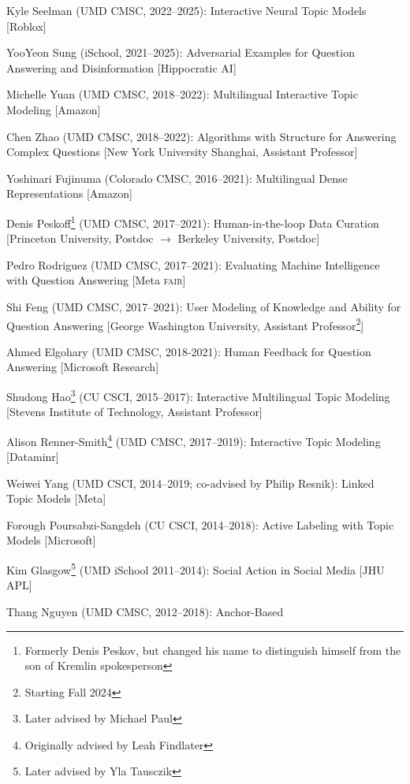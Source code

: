 \begin{enumerate*}
        \item Kyle Seelman (UMD CMSC, 2022--2025): Interactive Neural
          Topic Models [Roblox]
       \item YooYeon Sung (iSchool, 2021--2025): Adversarial Examples for
         Question Answering and Disinformation [Hippocratic AI]
  \item Michelle Yuan (UMD CMSC, 2018--2022): Multilingual Interactive Topic
  Modeling [Amazon]
      \item Chen Zhao (UMD CMSC, 2018--2022): Algorithms with
        Structure for Answering Complex Questions [New York
        University Shanghai, Assistant Professor]
  \item Yoshinari Fujinuma (Colorado CMSC, 2016--2021): Multilingual
    Dense Representations [Amazon]        
      \item Denis Peskoff\footnote{Formerly Denis Peskov, but changed
          his name to distinguish himself from the son of Kremlin
          spokesperson} (UMD CMSC, 2017--2021): Human-in-the-loop
        Data Curation [Princeton University, Postdoc $\rightarrow$
        Berkeley University, Postdoc]
\item Pedro Rodriguez (UMD CMSC, 2017--2021): Evaluating Machine
  Intelligence with Question Answering [Meta \textsc{fair}]
\item Shi Feng (UMD CMSC, 2017--2021): User Modeling of Knowledge and
  Ability for Question Answering [George Washington University, Assistant Professor\footnote{Starting Fall 2024}]
\item Ahmed Elgohary (UMD CMSC, 2018-2021): Human Feedback for
  Question Answering [Microsoft Research]
\item Shudong Hao\footnote{Later advised by Michael Paul} (CU CSCI, 2015--2017): Interactive Multilingual
  Topic Modeling [Stevens Institute of Technology, Assistant Professor]
  \item Alison Renner-Smith\footnote{Originally advised by Leah Findlater} (UMD CMSC, 2017--2019): Interactive Topic Modeling [Dataminr]
\item Weiwei Yang (UMD CSCI, 2014--2019; co-advised by Philip Resnik): Linked Topic Models [Meta]
\item Forough Poursabzi-Sangdeh (CU CSCI, 2014--2018): Active Labeling with Topic Models [Microsoft]
\item Kim Glasgow\footnote{Later advised by Yla Tausczik} (UMD iSchool 2011--2014): Social Action in Social Media [JHU APL]
\item Thang Nguyen (UMD CMSC, 2012--2018): Anchor-Based

\end{enumerate*}
